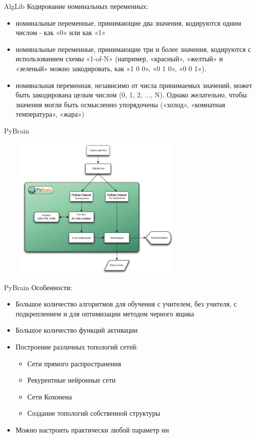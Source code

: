 \documentclass{beamer}
\begin{document}
\begin{frame}{AlgLib}
    Кодирование номинальных переменных:
    \begin{itemize}
        \item номинальные переменные, принимающие два значения, кодируются
            одним числом - как «0» или как «1»
        \item номинальные переменные, принимающие три и более значения,
            кодируются с использованием схемы «1-of-N» (например, «красный»,
            «желтый» и «зеленый» можно закодировать, как «1 0 0», «0 1 0»,
            «0 0 1»).
        \item номинальная переменная, независимо от числа принимаемых значений,
            может быть закодирована целым числом (0, 1, 2, ..., N). Однако
            желательно, чтобы значения могли быть осмысленно упорядочены
            («холод», «комнатная температура», «жара»)
    \end{itemize}
\end{frame}

\begin{frame}{PyBrain}
    \begin{center}
        \includegraphics[width=100mm,height=70mm]{pybrain}
    \end{center}
\end{frame}

\begin{frame}{PyBrain}
    Особенности:
    \begin{itemize}
        \item Большое количество алгоритмов для обучения с учителем, без
            учителя, с подкреплением и для оптимизации методом черного ящика
        \item Большое количество функций активации
        \item Построение различных топологий сетей:
            \begin{itemize}
                \item Сети прямого распространения
                \item Рекурентные нейронные сети
                \item Сети Кохонена
                \item Создание топологий собственной структуры
            \end{itemize}
        \item Можно настроить практически любой параметр нн
    \end{itemize}
\end{frame}
\end{document}
